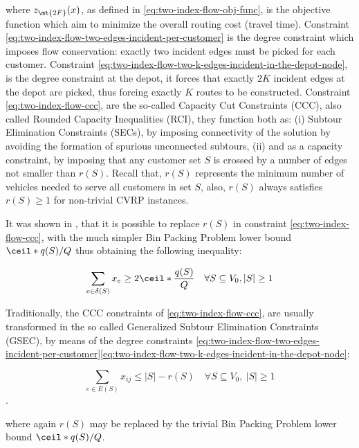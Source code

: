 where $z_\mt{2F}(x)$, as defined in \eqref{eq:two-index-flow-obj-func}, is the objective function which aim to minimize the overall routing cost (travel time).
Constraint \eqref{eq:two-index-flow-two-edges-incident-per-customer} is the degree constraint which imposes flow conservation: exactly two incident edges must be picked for each customer.
Constraint \eqref{eq:two-index-flow-two-k-edges-incident-in-the-depot-node}, is the degree constraint at the depot, it forces that exactly $2K$ incident edges at the depot are picked, thus forcing exactly $K$ routes to be constructed.
Constraint \eqref{eq:two-index-flow-ccc}, are the so-called Capacity Cut Constraints (CCC), also called Rounded Capacity Inequalities (RCI), they function both as:
(i) Subtour Elimination Constraints (SECs), by imposing connectivity of the solution by avoiding the formation of spurious unconnected subtours,
(ii) and as a capacity constraint, by imposing that any customer set $S$ is crossed by a number of edges not smaller than $r(S)$.
Recall that, $r(S)$ represents the minimum number of vehicles needed to serve all customers in set $S$,
also, $r(S)$ always satisfies $r(S) \ge 1$ for non-trivial CVRP instances.

It was shown in \textcite{cornuejols1993}, that it is possible to replace $r(S)$ in constraint
\eqref{eq:two-index-flow-ccc}, with the much simpler Bin Packing Problem lower bound $\ceil*{q(S) / Q}$
thus obtaining the following inequality:

\begin{equation}
	\sum_{e \in \delta(S)} x_e \ge 2 \ceil*{\frac{q(S)}{Q}}   \quad \forall S \subseteq V_0, |S| \ge 1 \label{eq:two-index-flow-ccc-bpp-lower-bound}                                                             \\
\end{equation}

Traditionally, the CCC constraints of \eqref{eq:two-index-flow-ccc}, are usually transformed in the so called Generalized Subtour Elimination Constraints (GSEC),
by means of the degree constraints \eqref{eq:two-index-flow-two-edges-incident-per-customer}\eqref{eq:two-index-flow-two-k-edges-incident-in-the-depot-node}:

\begin{equation}\label{eq:cvrp-2flow-gsec}
	\sum_{e \in E(S)} x_{ij} \le |S| - r(S) \quad \forall S \subseteq V_0,\ |S| \ge 1
\end{equation}.

where again $r(S)$ may be replaced by the trivial Bin Packing Problem lower bound $\ceil*{q(S) / Q}$.

